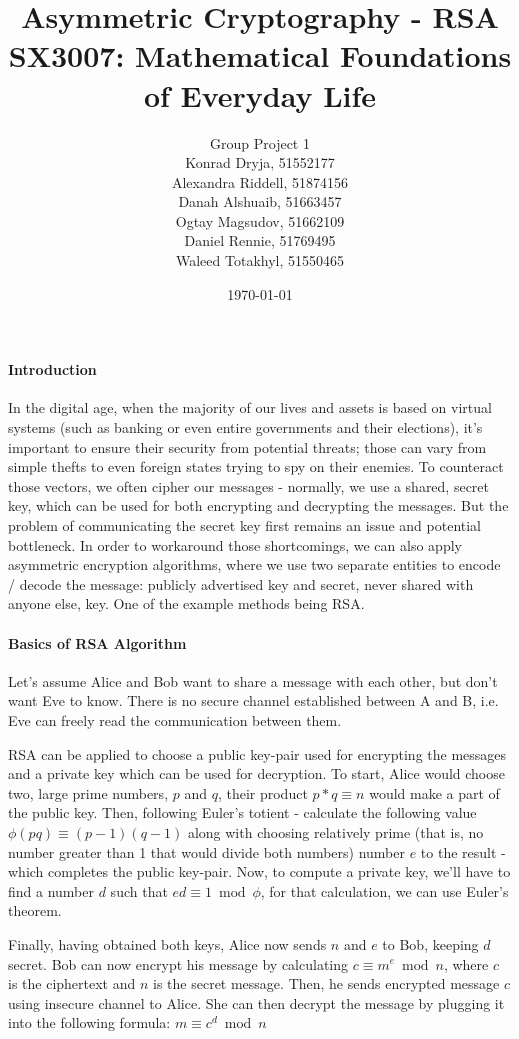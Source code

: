 \documentclass[11pt]{article}
\title{Asymmetric Cryptography - RSA \\
\large SX3007: Mathematical Foundations of Everyday Life}
\date{\today}
\author{Group Project 1 \\
  Konrad Dryja, 51552177 \\
  Alexandra Riddell, 51874156 \\
  Danah Alshuaib, 51663457 \\
  Ogtay Magsudov, 51662109 \\
  Daniel Rennie, 51769495 \\
  Waleed Totakhyl, 51550465}
\begin{document}
\maketitle
\begin{multicols}{2}

\paragraph{Introduction}
In the digital age, when the majority of our lives and assets is based on virtual systems (such as banking or even entire governments and their elections), it's important to ensure their security from potential threats; those can vary from simple thefts to even foreign states trying to spy on their enemies. To counteract those vectors, we often cipher our messages - normally, we use a shared, secret key, which can be used for both encrypting and decrypting the messages. But the problem of communicating the secret key first remains an issue and potential bottleneck. In order to workaround those shortcomings, we can also apply asymmetric encryption algorithms, where we use two separate entities to encode / decode the message: publicly advertised key and secret, never shared with anyone else, key. One of the example methods being RSA.

\paragraph{Basics of RSA Algorithm}
Let's assume Alice and Bob want to share a message with each other, but don't want Eve to know. There is no secure channel established between A and B, i.e. Eve can freely read the communication between them.

RSA can be applied to choose a public key-pair used for encrypting the messages and a private key which can be used for decryption. To start, Alice would choose two, large prime numbers, $p$ and $q$, their product $p*q \equiv n$ would make a part of the public key. Then, following Euler's totient - calculate the following value $\phi(pq) \equiv (p-1)(q-1)$ along with choosing relatively prime (that is, no number greater than 1 that would divide both numbers) number $e$ to the result - which completes the public key-pair. Now, to compute a private key, we'll have to find a number $d$ such that \(ed \equiv 1 \bmod \phi\), for that calculation, we can use Euler's theorem.

Finally, having obtained both keys, Alice now sends $n$ and $e$ to Bob, keeping $d$ secret. Bob can now encrypt his message by calculating \(c \equiv m^e \bmod n\), where $c$ is the ciphertext and $n$ is the secret message. Then, he sends encrypted message $c$ using insecure channel to Alice. She can then decrypt the message by plugging it into the following formula: $m \equiv c^d \bmod n$



\end{multicols}
\end{document}
